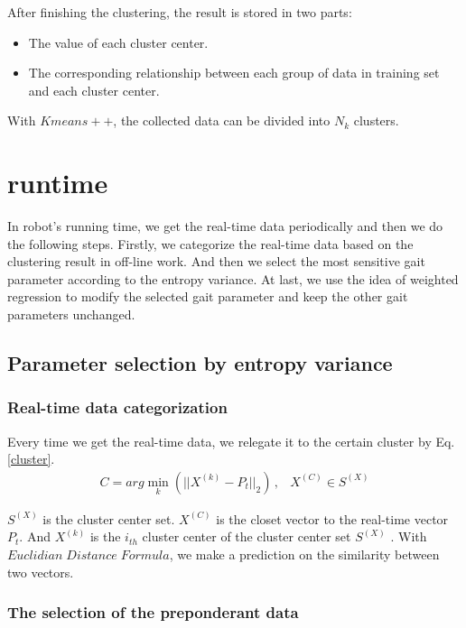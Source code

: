 After finishing the clustering, the result is stored in two parts:

\begin{itemize}
	\item The value of each cluster center.
	\item The corresponding relationship between each group of data in training set and each cluster center.
\end{itemize}

With $Kmeans++$, the collected data can be divided into $N_{k}$ clusters.

\section{runtime}
In robot's running time, we get the real-time data periodically and then we do the following steps. Firstly, we categorize the real-time data based on the clustering result in off-line work. And then we select the most sensitive gait parameter according to the entropy variance. At last, we use the idea of weighted regression to modify the selected gait parameter and keep the other gait parameters unchanged.
\subsection{Parameter selection by entropy variance}

\subsubsection{Real-time data categorization}

Every time we get the real-time data, we relegate it to the certain cluster by Eq.\ref{cluster}.
\begin{eqnarray}\label{cluster}
C=arg\min \limits_{k}{(||X^{(k)}-P_{t}||_{2})} \, ,&X^{(C)}\in S^{(X)}
\end{eqnarray}

$S^{(X)}$ is the cluster center set. $X^{(C)}$ is the closet vector to the real-time vector $P_t$. And $X^{(k)}$ is the $i_{th}$ cluster center of the cluster center set $S^{(X)}$ . With $Euclidian \; Distance \; Formula$, we make a prediction on the similarity between two vectors.

\subsubsection{The selection of the preponderant data}

